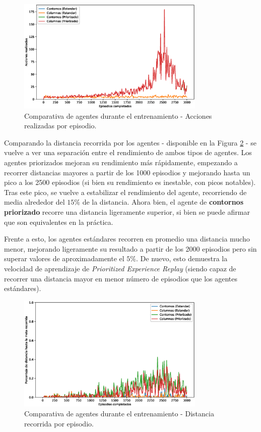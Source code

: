 \begin{figure}[h]
    \centering
    \includegraphics[width=0.8\textwidth]{imagenes/cap6/comparison/smoothed_actions.eps}
    \caption{Comparativa de agentes durante el entrenamiento - Acciones realizadas por episodio.}
    \label{fig:chap6-comparison-actions}
\end{figure}

Comparando la distancia recorrida por los agentes - disponible en la Figura \ref{fig:chap6-comparison-distances} - se vuelve a ver una separación entre el rendimiento de ambos tipos de agentes. Los agentes priorizados mejoran su rendimiento más rápidamente, empezando a recorrer distancias mayores a partir de los 1000 episodios y mejorando hasta un pico a los 2500 episodios (si bien su rendimiento es inestable, con picos notables). Tras este pico, se vuelve a estabilizar el rendimiento del agente, recorriendo de media alrededor del $15\%$ de la distancia. Ahora bien, el agente de \textbf{contornos priorizado} recorre una distancia ligeramente superior, si bien se puede afirmar que son equivalentes en la práctica.

\newpage

Frente a esto, los agentes estándares recorren en promedio una distancia mucho menor, mejorando ligeramente su resultado a partir de los 2000 episodios pero sin superar valores de aproximadamente el $5\%$. De nuevo, esto demuestra la velocidad de aprendizaje de \textit{Prioritized Experience Replay} (siendo capaz de recorrer una distancia mayor en menor número de episodios que los agentes estándares).

\begin{figure}[h!]
    \centering
    \includegraphics[width=0.8\textwidth]{imagenes/cap6/comparison/smoothed_distances.eps}
    \caption{Comparativa de agentes durante el entrenamiento - Distancia recorrida por episodio.}
    \label{fig:chap6-comparison-distances}
\end{figure}

